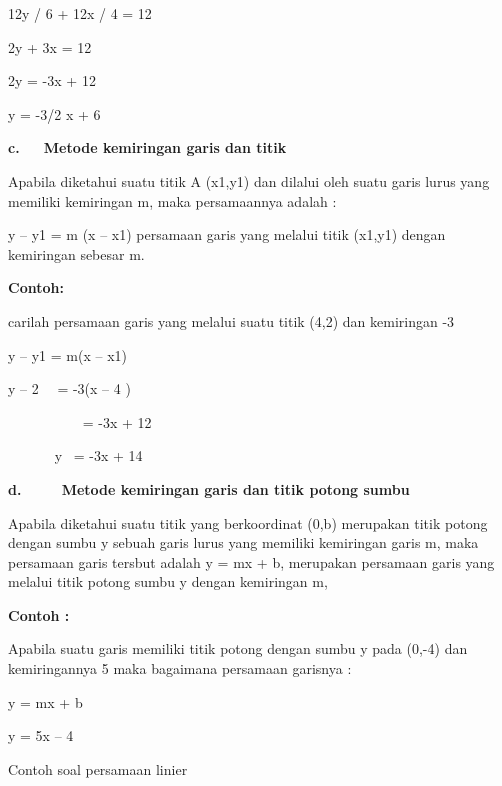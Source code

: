 \documentclass[11pt,fleqn]{book} %
\begin{document}
\begin{myEnumerate}
\begin{itemize}
\noindent 12y / 6 + 12x / 4 = 12

\noindent 2y + 3x = 12

\noindent 2y = -3x + 12

\noindent y = -3/2 x + 6

\noindent 

\noindent 

\noindent \textbf{c.~~~Metode kemiringan garis dan titik}

\noindent Apabila diketahui suatu titik A (x1,y1) dan dilalui oleh suatu garis lurus yang memiliki kemiringan m, maka persamaannya adalah :

\noindent 

\noindent y -- y1 = m (x -- x1) persamaan garis yang melalui titik (x1,y1) dengan kemiringan sebesar m. 

\noindent \textbf{}

\noindent \textbf{Contoh:}

\noindent \textbf{}

\noindent carilah persamaan garis yang melalui suatu titik (4,2) dan kemiringan -3

\noindent 

\noindent y -- y1 = m(x -- x1)

\noindent y -- 2~~ = -3(x -- 4 )

\noindent ~~~~~~~~~~ = -3x + 12

\noindent ~~~~~~ y~ = -3x + 14

\noindent 

\noindent \textbf{d.~~~~~Metode kemiringan garis dan titik potong sumbu}

\noindent Apabila diketahui suatu titik yang berkoordinat (0,b) merupakan titik potong dengan sumbu y sebuah garis lurus yang memiliki kemiringan garis m, maka persamaan garis tersbut adalah y = mx + b, merupakan persamaan garis yang melalui titik potong sumbu y dengan kemiringan m, 

\noindent 

\noindent \textbf{Contoh :}

\noindent \textbf{}

\noindent Apabila suatu garis memiliki titik potong dengan sumbu y pada (0,-4) dan kemiringannya 5 maka bagaimana persamaan garisnya :

\noindent 

\noindent y = mx + b

\noindent y = 5x -- 4

\noindent 

\noindent \eject Contoh soal persamaan linier


\end{itemize}
\end{myEnumerate}
\end{document}
